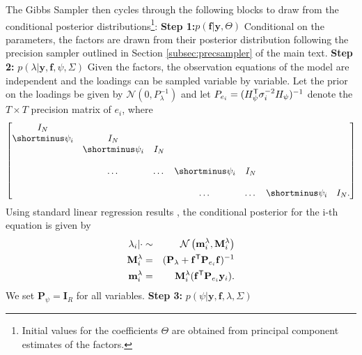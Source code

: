 \documentclass[notitlepage,a4paper,12pt]{article}
\begin{document}
\begin{ThreePartTable}
The Gibbs Sampler then cycles through the following blocks to draw from the conditional posterior distributions\footnote{Initial values for the coefficients  $\Theta$ are obtained from principal component estimates of the factors. 
}:
\newline
\linebreak
\textbf{Step 1:}$p(\mathbf{f}|\mathbf{y}, \Theta)$
\newline
Conditional on the parameters, the factors are drawn from their posterior distribution following the precision sampler outlined in Section \ref{subsec:precsampler} of the main text.
\newline
\linebreak
\textbf{Step 2:} $p(\lambda| \mathbf{y}, \mathbf{f}, \psi, \Sigma)$
\newline
Given the factors, the observation equations of the model are independent and the loadings can be sampled variable by variable. Let the prior on the loadings be given by $\mathcal{N}(0, P_{\lambda}^{-1})$ and let $P_{e_i} = (H^{\sf{T}}_{\psi} \sigma^{-2}_i H_{\psi})^{-1}$ denote the $T \times T$ precision matrix of $e_i$, where 
$$
\begin{bmatrix}
    I_N &  \\
    \shortminus \psi_i & I_N &  \\
     & \shortminus \psi_i & I_N &  \\
     &  &  &  &  & \\
    & \dots & \dots & \shortminus \psi_i & I_N \\
     &  &  &  &  & \\
    & &  & \dots & \dots & \shortminus \psi_i & I_N.
\end{bmatrix}
$$
Using standard linear regression results \citep[see][]{chankroese_2013}, the conditional posterior for the i-th equation is given by
\begin{eqnarray}\label{eq:posterior_lambda}
    \lambda_{i} | \cdot &\sim& \mathcal{N}\left(\mathbf{m}^{\lambda}_i,\mathbf{M}^{\lambda}_i \right) \\
    \mathbf{M}^{\lambda}_i &=& (\mathbf{P}_{\lambda} + \mathbf{f}^{\sf{T}} \mathbf{P}_{e_i} \mathbf{f})^{-1} \\ 
    \mathbf{m}^{\lambda}_i &=& \mathbf{M}^{\lambda}_i (\mathbf{f}^{\sf{T}} \mathbf{P}_{e_i} \mathbf{y}_i).
\end{eqnarray} 
We set $\mathbf{P}_{\psi} = \mathbf{I}_R$ for all variables. 
\newline
\linebreak
\textbf{Step 3:} $p(\psi| \mathbf{y}, \mathbf{f}, \lambda, \Sigma)$

\end{ThreePartTable}
\end{document}
